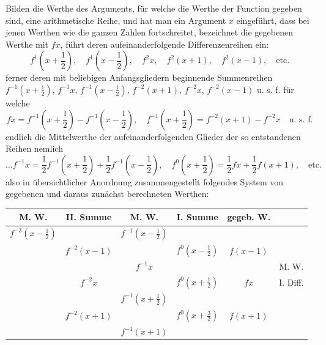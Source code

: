 \documentclass[12pt,a4paper]{article}
\theoremstyle{plain}
\begin{document}
Bilden die Werthe des Arguments, für welche die Werthe der Function gegeben sind, eine arithmetische Reihe, und hat man ein Argument $x$ eingeführt, dass bei
jenen Werthen wie die ganzen Zahlen fortschreitet, bezeichnet die gegebenen Werthe mit $fx$, führt deren aufeinanderfolgende Differenzenreihen ein:
\[
f^1(x+\frac{1}{2}),\quad f^1(x-\frac{1}{2}),\quad f^2x,\quad f^2(x+1),\quad f^2(x-1),\quad\text{etc.}
\]
ferner deren mit beliebigen Anfangsgliedern beginnende Summenreihen
$f^{-1}(x+\frac{1}{2})$, $f^{-1}x$, $f^{-1}(x-\frac{1}{2})$, $f^{-2}(x+1)$, $f^{-2}x$, $f^{-2}(x-1)$ u. s. f. für welche
\[
fx = f^{-1}(x+\frac{1}{2}) - f^{-1}(x-\frac{1}{2}),\quad f^{-1}(x+\frac{1}{2}) = f^{-2}(x+1) - f^{-2}x\quad\text{u. s. f.}
\]
endlich die Mittelwerthe der aufeinanderfolgenden Glieder der so entstandenen Reihen nemlich
\[
\ldots f^{-1}x = \frac{1}{2}f^{-1}(x+\frac{1}{2}) + \frac{1}{2}f^{-1}(x-\frac{1}{2}),\quad f^0(x+\frac{1}{2}) = \frac{1}{2}fx + \frac{1}{2}f(x+1),\quad\text{etc.}
\]
also in übersichtlicher Anordnung zusammengestellt folgendes System von gegebenen und daraus zunächst berechneten Werthen:

\begin{center}
\begin{tabular}{cc|cc|cc} M. W. & II. Summe & M. W. & I. Summe & gegeb. W. & \\
\hline
$f^{-3}(x-\frac{1}{2})$ & & $f^{-1}(x-\frac{1}{2})$ & & & \\
& $f^{-2}(x-1)$ & & $f^0(x-\frac{1}{2})$ & $f(x-1)$ & \\
& & $f^{-1}x$ & & & M. W. \\
& $f^{-2}x$ & & $f^0(x+\frac{1}{2})$ & $fx$ & I. Diff. \\
& & $f^{-1}(x+\frac{1}{2})$ & & & \\
& $f^{-2}(x+1)$ & & $f^0(x+\frac{3}{2})$ & $f(x+1)$ & \\
& & $f^{-1}(x+1)$ & & &
\end{tabular}
\end{center}
\end{document}
